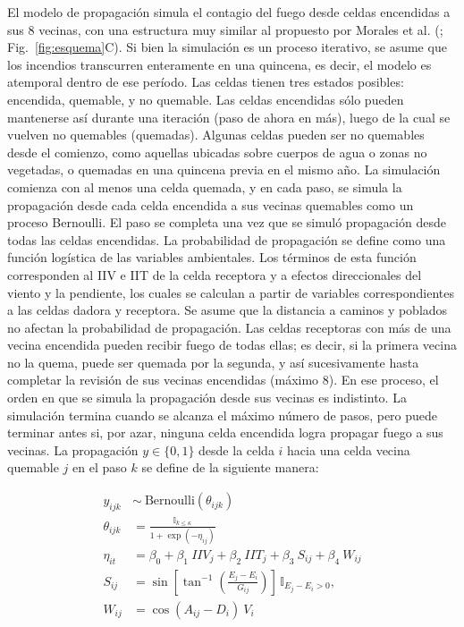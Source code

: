 El modelo de propagación simula el contagio del fuego desde celdas encendidas a sus 8 vecinas, con una estructura muy similar al propuesto por Morales et al. (\citealt{morales_stochastic_2015}; Fig.~\ref{fig:esquema}C). Si bien la simulación es un proceso iterativo, se asume que los incendios transcurren enteramente en una quincena, es decir, el modelo es atemporal dentro de ese período. Las celdas tienen tres estados posibles: encendida, quemable, y no quemable. Las celdas encendidas sólo pueden mantenerse así durante una iteración (paso de ahora en más), luego de la cual se vuelven no quemables (quemadas). Algunas celdas pueden ser no quemables desde el comienzo, como aquellas ubicadas sobre cuerpos de agua o zonas no vegetadas, o quemadas en una quincena previa en el mismo año. La simulación comienza con al menos una celda quemada, y en cada paso, se simula la propagación desde cada celda encendida a sus vecinas quemables como un proceso Bernoulli. El paso se completa una vez que se simuló propagación desde todas las celdas encendidas. La probabilidad de propagación se define como una función logística de las variables ambientales. Los términos de esta función corresponden al IIV e IIT de la celda receptora y a efectos direccionales del viento y la pendiente, los cuales se calculan a partir de variables correspondientes a las celdas dadora y receptora. Se asume que la distancia a caminos y poblados no afectan la probabilidad de propagación. Las celdas receptoras con más de una vecina encendida pueden recibir fuego de todas ellas; es decir, si la primera vecina no la quema, puede ser quemada por la segunda, y así sucesivamente hasta completar la revisión de sus vecinas encendidas (máximo 8). En ese proceso, el orden en que se simula la propagación desde sus vecinas es indistinto. La simulación termina cuando se alcanza el máximo número de pasos, pero puede terminar antes si, por azar, ninguna celda encendida logra propagar fuego a sus vecinas. 
La propagación $y \in \{0, 1\}$ desde la celda $i$ hacia una celda vecina quemable $j$ en el paso $k$ se define de la siguiente manera:

\begin{equation}
\label{eq:datamodel}
\begin{aligned}
    y_{ijk} &\sim \ \text{Bernoulli}(\theta_{ijk}) \\
    \theta_{ijk} &= \frac{\mathbb{I}_{k \le \kappa}}{1 + \exp{(-\eta_{ij})}} \\
    \eta_{it} &= \beta_0 + \beta_1 \ IIV_j + \beta_2 \ IIT_j + \beta_3 \ S_{ij} + \beta_4 \ W_{ij} \\
    S_{ij} &= \sin\left[ \tan^{-1} \left( \frac{E_j - E_i}{G_{ij}} \right) \right] \, \mathbb{I}_{E_j - E_i > 0}, \\
    W_{ij} &= \cos(A_{ij} - D_i) \ V_i
\end{aligned}
\end{equation}

